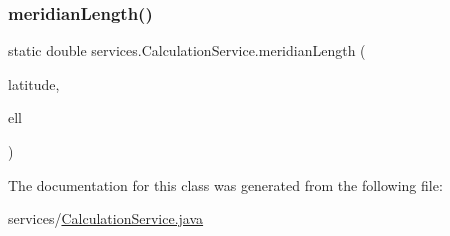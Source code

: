 \subsubsection{\texorpdfstring{meridian\+Length()}{meridianLength()}}
{\footnotesize\ttfamily static double services.\+Calculation\+Service.\+meridian\+Length (\begin{DoxyParamCaption}\item[{double}]{latitude,  }\item[{\hyperlink{classparams_1_1_ellipsoid_parms}{Ellipsoid\+Parms}}]{ell }\end{DoxyParamCaption})\hspace{0.3cm}{\ttfamily [static]}}



The documentation for this class was generated from the following file\+:\begin{DoxyCompactItemize}
\item 
services/\hyperlink{_calculation_service_8java}{Calculation\+Service.\+java}\end{DoxyCompactItemize}
